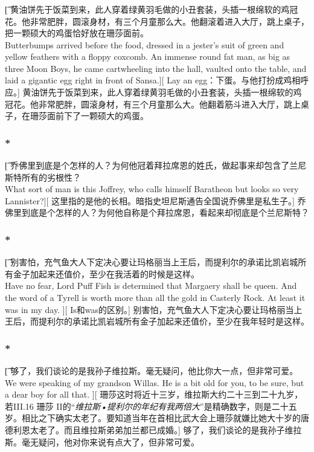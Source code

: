 \documentclass[12pt,a4paper]{article}
\begin{document}
\subsubsection{}\t[
	黄油饼先于饭菜到来，此人穿着绿黄羽毛做的小丑套装，头插一根绵软的鸡冠花。他非常肥胖，圆滚身材，有三个月童那么大。他翻滚着进入大厅，跳上桌子，把一颗硕大的鸡蛋恰好放在珊莎面前。\\
	Butterbumps arrived before the food, dressed in a jester's suit of green and yellow feathers with a floppy coxcomb. An immense round fat man, as big as three Moon Boys, he came cartwheeling into the hall, vaulted onto the table, and laid a gigantic egg right in front of Sansa.][
	Lay an egg：下蛋。与他打扮成鸡相呼应。]
	黄油饼先于饭菜到来，此人穿着绿黄羽毛做的小丑套装，头插一根绵软的鸡冠花。他非常肥胖，圆滚身材，有三个月童那么大。他翻着筋斗进入大厅，跳上桌子，在珊莎面前下了一颗硕大的鸡蛋。

\subsubsection{\color{red}*}\t[
	乔佛里到底是个怎样的人？为何他冠着拜拉席恩的姓氏，做起事来却包含了兰尼斯特所有的劣根性？\\
	What sort of man is this Joffrey, who calls himself Baratheon but looks so very Lannister?][
	这里指的是他的长相。暗指史坦尼斯通告全国说乔佛里是私生子。]	
	乔佛里到底是个怎样的人？为何他自称是个拜拉席恩，看起来却彻底是个兰尼斯特？
	
\subsubsection{\color{red}*}\t[
	别害怕，充气鱼大人下定决心要让玛格丽当上王后，而提利尔的承诺比凯岩城所有金子加起来还值价，至少在我活着的时候是这样。\\
	Have no fear, Lord Puff Fish is determined that Margaery shall be queen. And the word of a Tyrell is worth more than all the gold in Casterly Rock. At least it was in my day. ][
	Is和was的区别。]
	别害怕，充气鱼大人下定决心要让玛格丽当上王后，而提利尔的承诺比凯岩城所有金子加起来还值价，至少在我年轻时是这样。
	
\subsubsection{\color{red}*}\t[
	够了，我们谈论的是我孙子维拉斯。毫无疑问，他比你大一点，但非常可爱。\\
	We were speaking of my grandson Willas. He is a bit old for you, to be sure, but a dear boy for all that. ][
	珊莎这时将近十三岁，维拉斯大约二十三到二十九岁，若III.16 珊莎 II的“\emph{维拉斯•提利尔的年纪有我两倍大}”是精确数字，则是二十五岁。相比之下确实太老了。要知道当年在首相比武大会上珊莎就嫌比她大十岁的唐德利恩太老了。而且维拉斯弟弟加兰都已成婚。]
	够了，我们谈论的是我孙子维拉斯。毫无疑问，他对你来说有点大了，但非常可爱。
	
\end{document}
